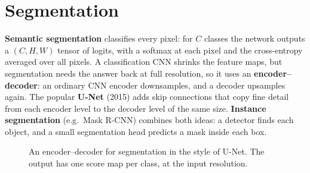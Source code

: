 \documentclass[12pt, a4paper]{article}
\newcommand{\cuboid}[6][-1.75]{%
  \pgfmathsetmacro{\off}{#4*0.3}
  \filldraw[fill=#5!20, draw=#5!80!black] (#2,-#4/2) rectangle ++(#3,#4);
  \filldraw[fill=#5!35, draw=#5!80!black]
  (#2,#4/2) -- ++(\off,\off) -- ++(#3,0) -- ++(-\off,-\off) -- cycle;
  \filldraw[fill=#5!50, draw=#5!80!black]
  (#2+#3,-#4/2) -- ++(\off,\off) -- ++(0,#4) -- ++(-\off,-\off) -- cycle;
  \node[below, font=\scriptsize, align=center] at (#2+#3/2,#1) {#6};
}
\begin{document}
\section{Segmentation}

\textbf{Semantic segmentation} classifies every pixel: for $C$ classes the
network outputs a $(C, H, W)$ tensor of logits, with a softmax at each pixel
and the cross-entropy averaged over all pixels. A classification CNN shrinks
the feature maps, but segmentation needs the answer back at full resolution,
so it uses an \textbf{encoder--decoder}: an ordinary CNN encoder downsamples,
and a decoder upsamples again. The popular \textbf{U-Net} (2015) adds skip
connections that copy fine detail from each encoder level to the decoder level
of the same size. \textbf{Instance segmentation} (e.g.\ Mask R-CNN) combines
both ideas: a detector finds each object, and a small segmentation head
predicts a mask inside each box.

\begin{figure}[H]
  \centering
  \caption{An encoder--decoder for segmentation in the style of U-Net. The
    output has one score map per class, at the input resolution.}
  \label{fig:unet}
\end{figure}
\end{document}
